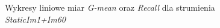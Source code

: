 \begin{figure}[h]
    \centering
    \qquad
    \caption{Wykresy liniowe miar \textit{G-mean} oraz \textit{Recall} dla strumienia \textit{StaticIm1+Im60}}\label{Figure:StaticIm1_Im60}
\end{figure}

\newpage

